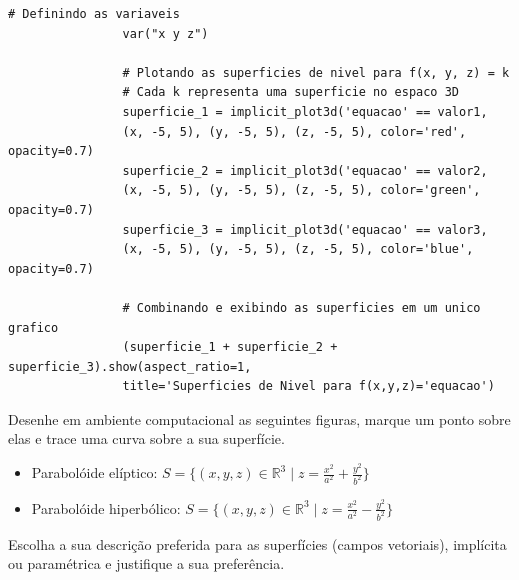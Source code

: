 \documentclass[../main.tex]{subfiles}
\begin{document}
\begin{solucao}
			\begin{lstlisting}[style=python_estiloso, caption={estrutura do codigo da questão 1, itens a), b), c)}]
				# Definindo as variaveis
				var("x y z")
				
				# Plotando as superficies de nivel para f(x, y, z) = k
				# Cada k representa uma superficie no espaco 3D
				superficie_1 = implicit_plot3d('equacao' == valor1,
				(x, -5, 5), (y, -5, 5), (z, -5, 5), color='red', opacity=0.7)
				superficie_2 = implicit_plot3d('equacao' == valor2,
				(x, -5, 5), (y, -5, 5), (z, -5, 5), color='green', opacity=0.7)
				superficie_3 = implicit_plot3d('equacao' == valor3,
				(x, -5, 5), (y, -5, 5), (z, -5, 5), color='blue', opacity=0.7)
				
				# Combinando e exibindo as superficies em um unico grafico
				(superficie_1 + superficie_2 + superficie_3).show(aspect_ratio=1,
				title='Superficies de Nivel para f(x,y,z)='equacao')
			\end{lstlisting}
			
		\end{solucao}
		
		\begin{exercicio}{2}
			Desenhe em ambiente computacional as seguintes figuras, marque um ponto sobre elas e trace uma curva sobre a sua superfície.
			\begin{itemize}
				\item Parabolóide elíptico: $S = \{(x, y, z) \in \mathbb{R}^3 \mid z = \tfrac{x^2}{a^2} + \tfrac{y^2}{b^2} \}$
				\item Parabolóide hiperbólico: $S = \{(x, y, z) \in \mathbb{R}^3 \mid z = \tfrac{x^2}{a^2} - \tfrac{y^2}{b^2} \}$
			\end{itemize}
			Escolha a sua descrição preferida para as superfícies (campos vetoriais), implícita ou paramétrica e justifique a sua preferência.
		\end{exercicio}
		
\end{document}
